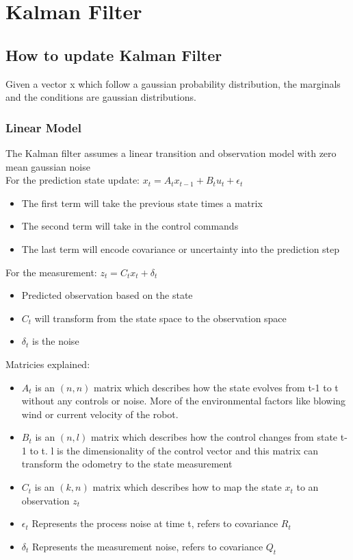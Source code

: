 \documentclass[a4paper]{article}
\begin{document}
\section{Kalman Filter}

\subsection{How to update Kalman Filter}
Given a vector x which follow a gaussian probability distribution, the marginals and the conditions are gaussian distributions.

\subsubsection{Linear Model}
The Kalman filter assumes a linear transition and observation model with zero mean gaussian noise
\\
For the prediction state update:
$x_t = A_tx_{t-1} + B_tu_t + \epsilon_t$

\begin{itemize}
    \item The first term will take the previous state times a matrix
    \item The second term will take in the control commands
    \item The last term will encode covariance or uncertainty into the prediction step
\end{itemize}

For the measurement:
$z_t = C_tx_t + \delta_t$
\begin{itemize}
    \item Predicted observation based on the state
    \item $C_t$ will transform from the state space to the observation space
    \item $\delta_t$ is the noise
\end{itemize}

Matricies explained:
\begin{itemize}
    \item $A_t$ is an $(n,n)$ matrix which describes how the state evolves from t-1 to t without any controls or noise. More of the environmental factors like blowing wind or current velocity of the robot.
    \item $B_t$ is an $(n, l)$ matrix which describes how the control changes from state t-1 to t. l is the dimensionality of the control vector and this matrix can transform the odometry to the state measurement
    \item $C_t$ is an $(k, n)$ matrix which describes how to map the state $x_t$ to an observation $z_t$
    \item $\epsilon_t$ Represents the process noise at time t, refers to covariance $R_t$
    \item $\delta_t$ Represents the measurement noise, refers to covariance $Q_t$
\end{itemize}
\end{document}
